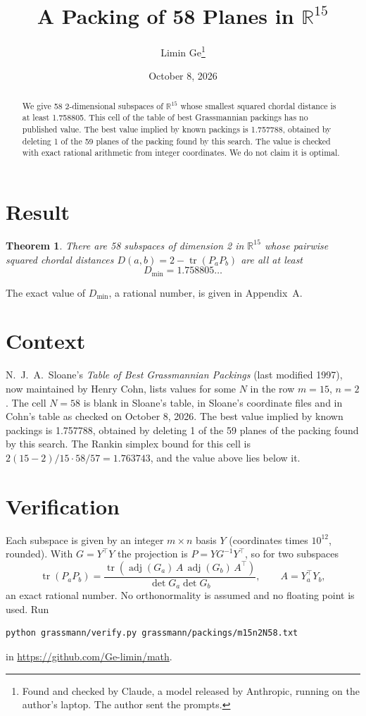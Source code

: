 \documentclass[11pt,a4paper]{article}
\title{A Packing of 58 Planes in $\mathbb{R}^{15}$}
\author{Limin Ge\thanks{Found and checked by Claude, a model released by Anthropic, running on the author's laptop. The author sent the prompts.}}
\date{October 8, 2026}
\newtheorem*{theorem}{Theorem}
\begin{document}
\maketitle
\begin{abstract}
We give 58 2-dimensional subspaces of $\mathbb{R}^{15}$ whose smallest squared chordal distance is at least 1.758805. This cell of the table of best Grassmannian packings has no published value. The best value implied by known packings is 1.757788, obtained by deleting 1 of the 59 planes of the packing found by this search. The value is checked with exact rational arithmetic from integer coordinates. We do not claim it is optimal.
\end{abstract}

\section{Result}
\begin{theorem}
There are 58 subspaces of dimension 2 in $\mathbb{R}^{15}$ whose pairwise squared chordal distances $D(a,b) = 2 - \operatorname{tr}(P_aP_b)$ are all at least
\[ D_{\min} = 1.758805\ldots \]
\end{theorem}
The exact value of $D_{\min}$, a rational number, is given in Appendix~A.


\section{Context}
N.~J.~A.~Sloane's \emph{Table of Best Grassmannian Packings} (last modified 1997), now maintained by Henry Cohn, lists values for some $N$ in the row $m=15$, $n=2$. The cell $N=58$ is blank in Sloane's table, in Sloane's coordinate files and in Cohn's table as checked on October 8, 2026. The best value implied by known packings is 1.757788, obtained by deleting 1 of the 59 planes of the packing found by this search. The Rankin simplex bound for this cell is $2(15-2)/15\cdot 58/57 = 1.763743$, and the value above lies below it.


\section{Verification}
Each subspace is given by an integer $m\times n$ basis $Y$ (coordinates times $10^{12}$, rounded). With $G=Y^\top Y$ the projection is $P=YG^{-1}Y^\top$, so for two subspaces
\[ \operatorname{tr}(P_aP_b)=\frac{\operatorname{tr}(\operatorname{adj}(G_a)\,A\,\operatorname{adj}(G_b)\,A^\top)}{\det G_a\det G_b},\qquad A=Y_a^\top Y_b, \]
an exact rational number. No orthonormality is assumed and no floating point is used. Run
\begin{verbatim}
python grassmann/verify.py grassmann/packings/m15n2N58.txt
\end{verbatim}
in \url{https://github.com/Ge-limin/math}.
\end{document}
